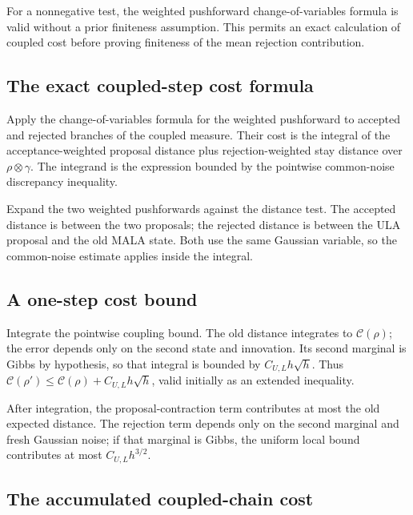 \documentclass[11pt,a4paper]{article}
\begin{document}
For a nonnegative test, the weighted pushforward change-of-variables formula is valid without a prior finiteness assumption. This permits an exact calculation of coupled cost before proving finiteness of the mean rejection contribution.


\subsection{\texorpdfstring{The exact coupled-step cost formula}{The exact coupled-step cost formula}}


Apply the change-of-variables formula for the weighted pushforward to accepted and rejected branches of the coupled measure. Their cost is the integral of the acceptance-weighted proposal distance plus rejection-weighted stay distance over \(\rho\otimes\gamma\). The integrand is the expression bounded by the pointwise common-noise discrepancy inequality.



Expand the two weighted pushforwards against the distance test. The accepted distance is between the two proposals; the rejected distance is between the ULA proposal and the old MALA state. Both use the same Gaussian variable, so the common-noise estimate applies inside the integral.


\subsection{\texorpdfstring{A one-step cost bound}{A one-step cost bound}}


Integrate the pointwise coupling bound. The old distance integrates to \(\mathcal C(\rho)\); the error depends only on the second state and innovation. Its second marginal is Gibbs by hypothesis, so that integral is bounded by \(C_{U,L}h\sqrt h\). Thus \(\mathcal C(\rho')\le\mathcal C(\rho)+C_{U,L}h\sqrt h\), valid initially as an extended inequality.



After integration, the proposal-contraction term contributes at most the old expected distance. The rejection term depends only on the second marginal and fresh Gaussian noise; if that marginal is Gibbs, the uniform local bound contributes at most \(C_{U,L}h^{3/2}\).


\subsection{\texorpdfstring{The accumulated coupled-chain cost}{The accumulated coupled-chain cost}}
\end{document}
